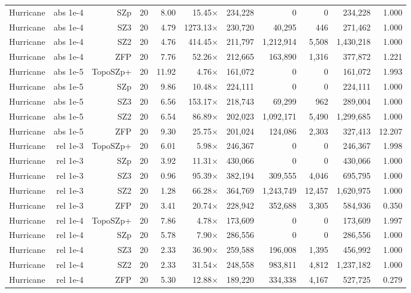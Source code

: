 \begin{tabular}{lrrrrrrrrrr}
Hurricane & abs 1e-4 & SZp & 20 & 8.00 & 15.45$\times$ & 234,228 & 0 & 0 & 234,228 & 1.000 \\
Hurricane & abs 1e-4 & SZ3 & 20 & 4.79 & 1273.13$\times$ & 230,720 & 40,295 & 446 & 271,462 & 1.000 \\
Hurricane & abs 1e-4 & SZ2 & 20 & 4.76 & 414.45$\times$ & 211,797 & 1,212,914 & 5,508 & 1,430,218 & 1.000 \\
Hurricane & abs 1e-4 & ZFP & 20 & 7.76 & 52.26$\times$ & 212,665 & 163,890 & 1,316 & 377,872 & 1.221 \\
Hurricane & abs 1e-5 & TopoSZp+ & 20 & 11.92 & 4.76$\times$ & 161,072 & 0 & 0 & 161,072 & 1.993 \\
Hurricane & abs 1e-5 & SZp & 20 & 9.86 & 10.48$\times$ & 224,111 & 0 & 0 & 224,111 & 1.000 \\
Hurricane & abs 1e-5 & SZ3 & 20 & 6.56 & 153.17$\times$ & 218,743 & 69,299 & 962 & 289,004 & 1.000 \\
Hurricane & abs 1e-5 & SZ2 & 20 & 6.54 & 86.89$\times$ & 202,023 & 1,092,171 & 5,490 & 1,299,685 & 1.000 \\
Hurricane & abs 1e-5 & ZFP & 20 & 9.30 & 25.75$\times$ & 201,024 & 124,086 & 2,303 & 327,413 & 12.207 \\
Hurricane & rel 1e-3 & TopoSZp+ & 20 & 6.01 & 5.98$\times$ & 246,367 & 0 & 0 & 246,367 & 1.998 \\
Hurricane & rel 1e-3 & SZp & 20 & 3.92 & 11.31$\times$ & 430,066 & 0 & 0 & 430,066 & 1.000 \\
Hurricane & rel 1e-3 & SZ3 & 20 & 0.96 & 95.39$\times$ & 382,194 & 309,555 & 4,046 & 695,795 & 1.000 \\
Hurricane & rel 1e-3 & SZ2 & 20 & 1.28 & 66.28$\times$ & 364,769 & 1,243,749 & 12,457 & 1,620,975 & 1.000 \\
Hurricane & rel 1e-3 & ZFP & 20 & 3.41 & 20.74$\times$ & 228,942 & 352,688 & 3,305 & 584,936 & 0.350 \\
Hurricane & rel 1e-4 & TopoSZp+ & 20 & 7.86 & 4.78$\times$ & 173,609 & 0 & 0 & 173,609 & 1.997 \\
Hurricane & rel 1e-4 & SZp & 20 & 5.78 & 7.90$\times$ & 286,556 & 0 & 0 & 286,556 & 1.000 \\
Hurricane & rel 1e-4 & SZ3 & 20 & 2.33 & 36.90$\times$ & 259,588 & 196,008 & 1,395 & 456,992 & 1.000 \\
Hurricane & rel 1e-4 & SZ2 & 20 & 2.33 & 31.54$\times$ & 248,558 & 983,811 & 4,812 & 1,237,182 & 1.000 \\
Hurricane & rel 1e-4 & ZFP & 20 & 5.30 & 12.88$\times$ & 189,220 & 334,338 & 4,167 & 527,725 & 0.279 \\

\end{tabular}
